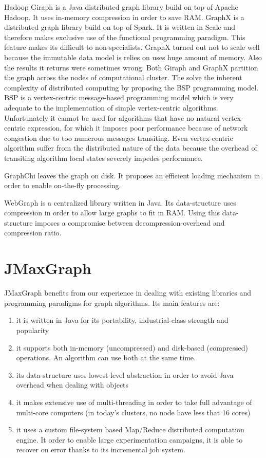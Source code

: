 \documentclass[11pt,a4paper]{article}
\begin{document}
Hadoop Giraph is a Java distributed graph library build on top of Apache Hadoop. It uses in-memory compression in order to save RAM.
GraphX is a distributed graph library build on top of Spark. It is written in Scale and therefore makes exclusive use of the functional programming paradigm. This feature makes its difficult to non-specialists. GraphX turned out not to scale well because the immutable data model is relies on uses huge amount of memory. Also the results it returns were sometimes wrong.
Both Giraph and GraphX partition the graph across the nodes of computational cluster. The solve the inherent complexity of distributed computing by proposing the BSP programming model. BSP is a vertex-centric message-based programming model which is very adequate to the implementation of simple vertex-centric algorithms. Unfortunately it cannot be used for algorithms that have no natural vertex-centric expression, for which it imposes poor performance because of network congestion due to too numerous messages transiting.
Even vertex-centric algorithm suffer from the distributed nature of the data because the overhead of transiting algorithm local states severely impedes performance.

GraphChi leaves the graph on disk. It proposes an efficient loading mechanism in order to enable on-the-fly processing.

WebGraph is a centralized library written in Java. Its data-structure 
uses compression in order to allow large graphs to fit in RAM. Using this data-structure imposes a compromise between decompression-overhead and compression ratio.

\section{JMaxGraph}

JMaxGraph benefits from our experience in dealing with existing libraries and programming paradigms for graph algorithms.
Its main features are:
\begin{enumerate}
\item it is written in Java for its portability, industrial-class strength and popularity
\item it supports both in-memory (uncompressed) and disk-based (compressed) operations. An algorithm can use both at the same time.
\item its data-structure uses lowest-level abstraction in order to avoid Java overhead when dealing with objects
\item it makes extensive use of multi-threading in order to take full advantage of multi-core computers (in today's clusters, no node have less that 16 cores)
\item it uses a custom file-system based Map/Reduce distributed computation engine. It order to enable large experimentation campaigns, it is able to recover on error thanks to its incremental job system.
\end{enumerate}
\end{document}
